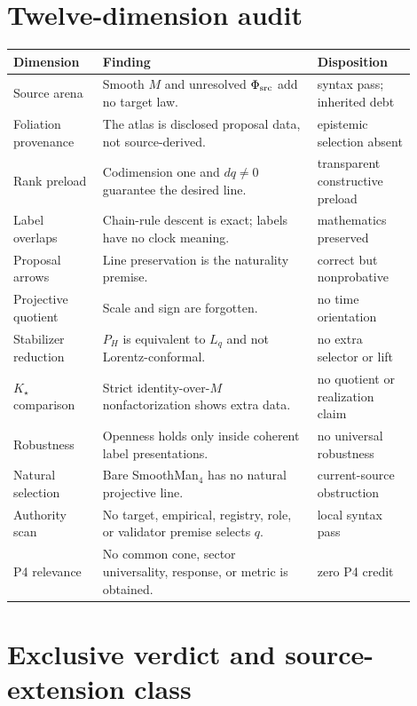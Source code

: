\documentclass[11pt]{article}
\begin{document}
\section{Twelve-dimension audit}

\begin{center}
\small
\begin{tabular}{p{0.20\linewidth}p{0.48\linewidth}p{0.22\linewidth}}
\toprule
Dimension & Finding & Disposition \\
\midrule
Source arena & Smooth $M$ and unresolved $\Phi_{\rm src}$ add no target law. & syntax pass; inherited debt \\
Foliation provenance & The atlas is disclosed proposal data, not source-derived. & epistemic selection absent \\
Rank preload & Codimension one and $dq\ne0$ guarantee the desired line. & transparent constructive preload \\
Label overlaps & Chain-rule descent is exact; labels have no clock meaning. & mathematics preserved \\
Proposal arrows & Line preservation is the naturality premise. & correct but nonprobative \\
Projective quotient & Scale and sign are forgotten. & no time orientation \\
Stabilizer reduction & $P_H$ is equivalent to $L_q$ and not Lorentz-conformal. & no extra selector or lift \\
$K_\star$ comparison & Strict identity-over-$M$ nonfactorization shows extra data. & no quotient or realization claim \\
Robustness & Openness holds only inside coherent label presentations. & no universal robustness \\
Natural selection & Bare SmoothMan$_4$ has no natural projective line. & current-source obstruction \\
Authority scan & No target, empirical, registry, role, or validator premise selects $q$. & local syntax pass \\
P4 relevance & No common cone, sector universality, response, or metric is obtained. & zero P4 credit \\
\bottomrule
\end{tabular}
\end{center}

\section{Exclusive verdict and source-extension class}
\end{document}
